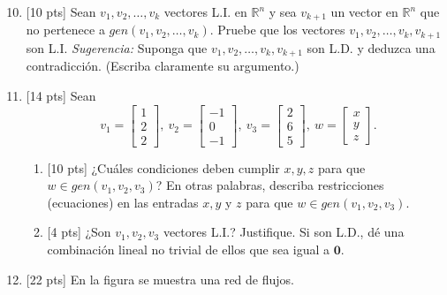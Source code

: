 \documentclass[11pt]{article}
\begin{document}
\begin{enumerate}
\setcounter{enumi}{9}
\item{}[10 pts] Sean $v_1,v_2,\dots,v_k$ vectores L.I. en $\mathbb{R}^n$ y sea $v_{k+1}$ un vector en $\mathbb{R}^n$ que no pertenece a $gen(v_1,v_2,\dots,v_k)$. Pruebe que los vectores $v_1,v_2,\dots,v_k,v_{k+1}$ son L.I. \textit{Sugerencia:} Suponga que $v_1,v_2,\dots,v_k,v_{k+1}$ son L.D. y deduzca una contradicción. (Escriba claramente su argumento.)

\vspace{5cm}

\item{}[14 pts] Sean
\[
v_1=\begin{bmatrix}1\\2\\2\end{bmatrix},\ v_2=\begin{bmatrix}-1\\0\\-1\end{bmatrix},\ v_3=\begin{bmatrix}2\\6\\5\end{bmatrix},\ w=\begin{bmatrix}x\\y\\z\end{bmatrix}.
\]
\begin{enumerate}
\item{}[10 pts] ¿Cuáles condiciones deben cumplir $x,y,z$ para que $w\in gen(v_1,v_2,v_3)$? En otras palabras, describa restricciones (ecuaciones) en las entradas $x, y$ y $z$ para que $w\in gen(v_1,v_2,v_3)$.

\vspace{4cm}

\item{}[4 pts] ¿Son $v_1,v_2,v_3$ vectores L.I.? Justifique. Si son L.D., dé una combinación lineal no trivial de ellos que sea igual a $\mathbf{0}$.

\vspace{4cm}
\end{enumerate}

\item{}[22 pts] En la figura se muestra una red de flujos.


\end{enumerate}
\end{document}
